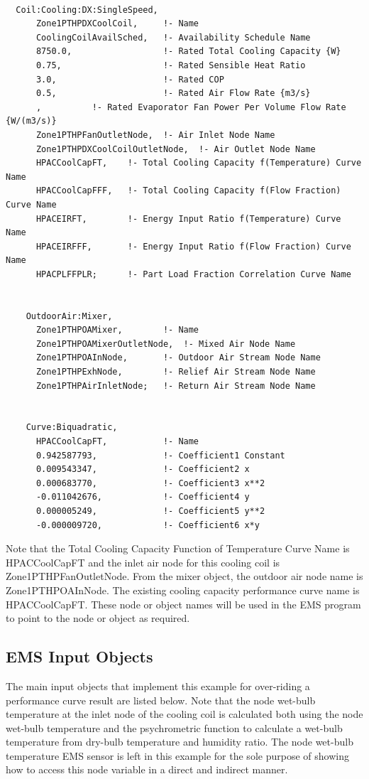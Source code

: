 \begin{lstlisting}

  Coil:Cooling:DX:SingleSpeed,
      Zone1PTHPDXCoolCoil,     !- Name
      CoolingCoilAvailSched,   !- Availability Schedule Name
      8750.0,                  !- Rated Total Cooling Capacity {W}
      0.75,                    !- Rated Sensible Heat Ratio
      3.0,                     !- Rated COP
      0.5,                     !- Rated Air Flow Rate {m3/s}
      ,          !- Rated Evaporator Fan Power Per Volume Flow Rate {W/(m3/s)}
      Zone1PTHPFanOutletNode,  !- Air Inlet Node Name
      Zone1PTHPDXCoolCoilOutletNode,  !- Air Outlet Node Name
      HPACCoolCapFT,    !- Total Cooling Capacity f(Temperature) Curve Name
      HPACCoolCapFFF,   !- Total Cooling Capacity f(Flow Fraction) Curve Name
      HPACEIRFT,        !- Energy Input Ratio f(Temperature) Curve Name
      HPACEIRFFF,       !- Energy Input Ratio f(Flow Fraction) Curve Name
      HPACPLFFPLR;      !- Part Load Fraction Correlation Curve Name


    OutdoorAir:Mixer,
      Zone1PTHPOAMixer,        !- Name
      Zone1PTHPOAMixerOutletNode,  !- Mixed Air Node Name
      Zone1PTHPOAInNode,       !- Outdoor Air Stream Node Name
      Zone1PTHPExhNode,        !- Relief Air Stream Node Name
      Zone1PTHPAirInletNode;   !- Return Air Stream Node Name


    Curve:Biquadratic,
      HPACCoolCapFT,           !- Name
      0.942587793,             !- Coefficient1 Constant
      0.009543347,             !- Coefficient2 x
      0.000683770,             !- Coefficient3 x**2
      -0.011042676,            !- Coefficient4 y
      0.000005249,             !- Coefficient5 y**2
      -0.000009720,            !- Coefficient6 x*y
\end{lstlisting}

Note that the Total Cooling Capacity Function of Temperature Curve Name is HPACCoolCapFT and the inlet air node for this cooling coil is Zone1PTHPFanOutletNode. From the mixer object, the outdoor air node name is Zone1PTHPOAInNode. The existing cooling capacity performance curve name is HPACCoolCapFT. These node or object names will be used in the EMS program to point to the node or object as required.

\subsection{EMS Input Objects}\label{ems-input-objects-001}

The main input objects that implement this example for over-riding a performance curve result are listed below. Note that the node wet-bulb temperature at the inlet node of the cooling coil is calculated both using the node wet-bulb temperature and the psychrometric function to calculate a wet-bulb temperature from dry-bulb temperature and humidity ratio. The node wet-bulb temperature EMS sensor is left in this example for the sole purpose of showing how to access this node variable in a direct and indirect manner.

